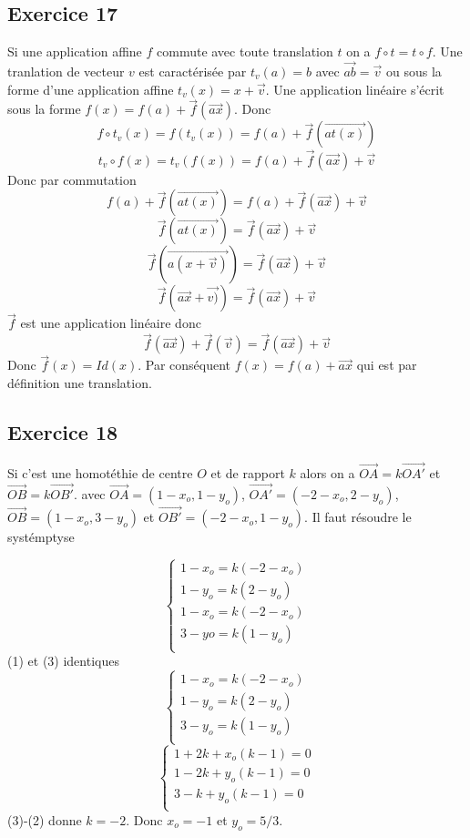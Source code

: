 \documentclass[]{book}
\theoremstyle{definition}
\newcommand{\vect}[1]{\overrightarrow{#1}}
\begin{document}
\subsection*{Exercice 17}
Si une application affine $f$ commute avec toute translation $t$ on a $f \circ t = t \circ f$. Une tranlation de vecteur $v$ est caract\'eris\'ee par $t_v(a) = b$ avec $\vect{ab} = \vect{v}$ ou sous la forme d'une application affine $t_v(x) = x + \vect{v}$. Une application lin\'eaire s'\'ecrit sous la forme $f(x) = f(a) + \vect{f}(\vect{ax})$.
Donc
$$
f \circ t_v(x) = f(t_v(x)) = f(a) + \vect{f}(\vect{at(x)})
$$
$$
t_v \circ f(x) = t_v(f(x)) = f(a) + \vect{f}(\vect{ax})  + \vect{v}
$$
Donc par commutation
$$
f(a) + \vect{f}(\vect{at(x)}) = f(a) + \vect{f}(\vect{ax})  + \vect{v}
$$
$$
\vect{f}(\vect{at(x)}) = \vect{f}(\vect{ax})  + \vect{v}
$$
$$
\vect{f}(\vect{a(x+\vect{v})}) = \vect{f}(\vect{ax})  + \vect{v}
$$
$$
\vect{f}(\vect{ax}+\vect{v)}) = \vect{f}(\vect{ax})  + \vect{v}
$$
$\vect{f}$ est une application lin\'eaire donc
$$
\vect{f}(\vect{ax}) +\vect{f}(\vect{v}) = \vect{f}(\vect{ax})  + \vect{v}
$$
Donc $\vect{f}(x) = Id(x)$. Par cons\'equent $f(x) = f(a) + \vect{ax}$ qui est par d\'efinition une translation.

\subsection*{Exercice 18}
Si c'est une homot\'ethie de centre $O$ et de rapport $k$ alors on a $\vect{OA} = k\vect{OA'}$ et $\vect{OB}= k\vect{OB'}$. avec $\vect{OA} = (1-x_o, 1 - y_o)$, $\vect{OA'} = (-2-x_o, 2 - y_o)$, $\vect{OB} = (1-x_o, 3 - y_o)$ et $\vect{OB'} = (-2-x_o, 1 - y_o)$. Il faut r\'esoudre le syst\'emptyse


$$
\left\{
\begin{array} {l}
    1 - x_o = k(-2-x_o) \\
    1 - y_o = k(2-y_o) \\
    1 - x_o = k(-2 -x_o) \\
    3 - yo = k(1-y_o) \\
\end{array}
\right.
$$
(1) et (3) identiques
$$
\left\{
\begin{array} {l}
    1 - x_o = k(-2-x_o) \\
    1 - y_o = k(2-y_o) \\
    3 - y_o = k(1-y_o) \\
\end{array}
\right.
$$
$$
\left\{
\begin{array} {l}
    1 +2k + x_o(k-1) = 0 \\
    1 -2k + y_o(k-1) = 0 \\
    3 -k + y_o(k-1) = 0 \\
\end{array}
\right.
$$
(3)-(2) donne $k = -2$. Donc $x_o = -1$ et $y_o = 5/3$.
\end{document}

